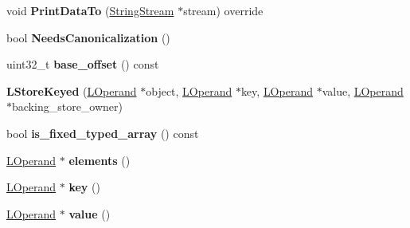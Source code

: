 \begin{DoxyCompactItemize}
\item 
void {\bfseries Print\+Data\+To} (\hyperlink{classv8_1_1internal_1_1_string_stream}{String\+Stream} $\ast$stream) override\hypertarget{classv8_1_1internal_1_1_l_store_keyed_a6904d9c0c8c7e81ec9aab35f73978d38}{}\label{classv8_1_1internal_1_1_l_store_keyed_a6904d9c0c8c7e81ec9aab35f73978d38}

\item 
bool {\bfseries Needs\+Canonicalization} ()\hypertarget{classv8_1_1internal_1_1_l_store_keyed_a638212d8d0abef68447e1451b452ac14}{}\label{classv8_1_1internal_1_1_l_store_keyed_a638212d8d0abef68447e1451b452ac14}

\item 
uint32\+\_\+t {\bfseries base\+\_\+offset} () const \hypertarget{classv8_1_1internal_1_1_l_store_keyed_aa88021608606f53948b262edeccda1e6}{}\label{classv8_1_1internal_1_1_l_store_keyed_aa88021608606f53948b262edeccda1e6}

\item 
{\bfseries L\+Store\+Keyed} (\hyperlink{classv8_1_1internal_1_1_l_operand}{L\+Operand} $\ast$object, \hyperlink{classv8_1_1internal_1_1_l_operand}{L\+Operand} $\ast$key, \hyperlink{classv8_1_1internal_1_1_l_operand}{L\+Operand} $\ast$value, \hyperlink{classv8_1_1internal_1_1_l_operand}{L\+Operand} $\ast$backing\+\_\+store\+\_\+owner)\hypertarget{classv8_1_1internal_1_1_l_store_keyed_a40acd77f50898d8601b8587509f6443f}{}\label{classv8_1_1internal_1_1_l_store_keyed_a40acd77f50898d8601b8587509f6443f}

\item 
bool {\bfseries is\+\_\+fixed\+\_\+typed\+\_\+array} () const \hypertarget{classv8_1_1internal_1_1_l_store_keyed_a9e741b26eae820e0effc84187cef9fd1}{}\label{classv8_1_1internal_1_1_l_store_keyed_a9e741b26eae820e0effc84187cef9fd1}

\item 
\hyperlink{classv8_1_1internal_1_1_l_operand}{L\+Operand} $\ast$ {\bfseries elements} ()\hypertarget{classv8_1_1internal_1_1_l_store_keyed_a65b49dc68849be2f341b9f6db3399248}{}\label{classv8_1_1internal_1_1_l_store_keyed_a65b49dc68849be2f341b9f6db3399248}

\item 
\hyperlink{classv8_1_1internal_1_1_l_operand}{L\+Operand} $\ast$ {\bfseries key} ()\hypertarget{classv8_1_1internal_1_1_l_store_keyed_a768f44140c1abab8ec345ef73cb417ea}{}\label{classv8_1_1internal_1_1_l_store_keyed_a768f44140c1abab8ec345ef73cb417ea}

\item 
\hyperlink{classv8_1_1internal_1_1_l_operand}{L\+Operand} $\ast$ {\bfseries value} ()\hypertarget{classv8_1_1internal_1_1_l_store_keyed_a6a97e536a0eed02971eb915a57b6e898}{}\label{classv8_1_1internal_1_1_l_store_keyed_a6a97e536a0eed02971eb915a57b6e898}


\end{DoxyCompactItemize}
